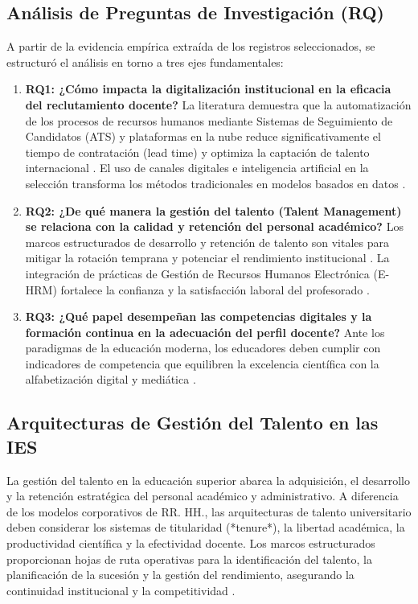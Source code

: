 \documentclass[conference]{IEEEtran}
\begin{document}
\subsection{Análisis de Preguntas de Investigación (RQ)}
A partir de la evidencia empírica extraída de los registros seleccionados, se estructuró el análisis en torno a tres ejes fundamentales:

\begin{enumerate}
    \item \textbf{RQ1: ¿Cómo impacta la digitalización institucional en la eficacia del reclutamiento docente?} 
    La literatura demuestra que la automatización de los procesos de recursos humanos mediante Sistemas de Seguimiento de Candidatos (ATS) y plataformas en la nube reduce significativamente el tiempo de contratación (lead time) y optimiza la captación de talento internacional \cite{fan2025_8}. El uso de canales digitales e inteligencia artificial en la selección transforma los métodos tradicionales en modelos basados en datos \cite{nain2026_47}.
    \item \textbf{RQ2: ¿De qué manera la gestión del talento (Talent Management) se relaciona con la calidad y retención del personal académico?} 
    Los marcos estructurados de desarrollo y retención de talento son vitales para mitigar la rotación temprana y potenciar el rendimiento institucional \cite{musakuro2022_71, sadagheyani2021_26}. La integración de prácticas de Gestión de Recursos Humanos Electrónica (E-HRM) fortalece la confianza y la satisfacción laboral del profesorado \cite{hussein2024_77, ebrahim2025_81}.
    \item \textbf{RQ3: ¿Qué papel desempeñan las competencias digitales y la formación continua en la adecuación del perfil docente?} 
    Ante los paradigmas de la educación moderna, los educadores deben cumplir con indicadores de competencia que equilibren la excelencia científica con la alfabetización digital y mediática \cite{ji2025_17, gorbatkova2023_15}.
\end{enumerate}

\subsection{Arquitecturas de Gestión del Talento en las IES}
La gestión del talento en la educación superior abarca la adquisición, el desarrollo y la retención estratégica del personal académico y administrativo. A diferencia de los modelos corporativos de RR. HH., las arquitecturas de talento universitario deben considerar los sistemas de titularidad (*tenure*), la libertad académica, la productividad científica y la efectividad docente. Los marcos estructurados proporcionan hojas de ruta operativas para la identificación del talento, la planificación de la sucesión y la gestión del rendimiento, asegurando la continuidad institucional y la competitividad \cite{musakuro2022_71}.
\end{document}
